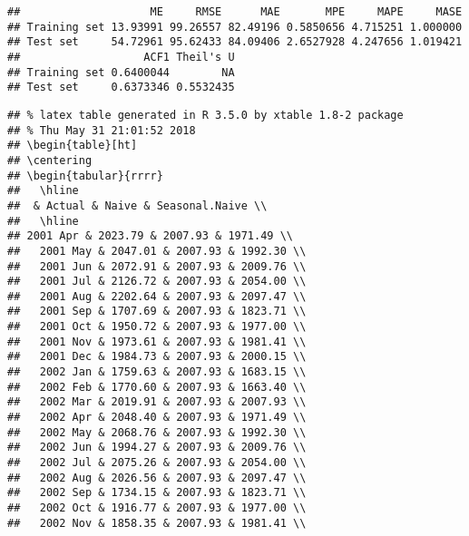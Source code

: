 \documentclass[]{article}
\begin{document}
\begin{verbatim}
##                    ME     RMSE      MAE       MPE     MAPE     MASE
## Training set 13.93991 99.26557 82.49196 0.5850656 4.715251 1.000000
## Test set     54.72961 95.62433 84.09406 2.6527928 4.247656 1.019421
##                   ACF1 Theil's U
## Training set 0.6400044        NA
## Test set     0.6373346 0.5532435
\end{verbatim}

\begin{verbatim}
## % latex table generated in R 3.5.0 by xtable 1.8-2 package
## % Thu May 31 21:01:52 2018
## \begin{table}[ht]
## \centering
## \begin{tabular}{rrrr}
##   \hline
##  & Actual & Naive & Seasonal.Naive \\ 
##   \hline
## 2001 Apr & 2023.79 & 2007.93 & 1971.49 \\ 
##   2001 May & 2047.01 & 2007.93 & 1992.30 \\ 
##   2001 Jun & 2072.91 & 2007.93 & 2009.76 \\ 
##   2001 Jul & 2126.72 & 2007.93 & 2054.00 \\ 
##   2001 Aug & 2202.64 & 2007.93 & 2097.47 \\ 
##   2001 Sep & 1707.69 & 2007.93 & 1823.71 \\ 
##   2001 Oct & 1950.72 & 2007.93 & 1977.00 \\ 
##   2001 Nov & 1973.61 & 2007.93 & 1981.41 \\ 
##   2001 Dec & 1984.73 & 2007.93 & 2000.15 \\ 
##   2002 Jan & 1759.63 & 2007.93 & 1683.15 \\ 
##   2002 Feb & 1770.60 & 2007.93 & 1663.40 \\ 
##   2002 Mar & 2019.91 & 2007.93 & 2007.93 \\ 
##   2002 Apr & 2048.40 & 2007.93 & 1971.49 \\ 
##   2002 May & 2068.76 & 2007.93 & 1992.30 \\ 
##   2002 Jun & 1994.27 & 2007.93 & 2009.76 \\ 
##   2002 Jul & 2075.26 & 2007.93 & 2054.00 \\ 
##   2002 Aug & 2026.56 & 2007.93 & 2097.47 \\ 
##   2002 Sep & 1734.15 & 2007.93 & 1823.71 \\ 
##   2002 Oct & 1916.77 & 2007.93 & 1977.00 \\ 
##   2002 Nov & 1858.35 & 2007.93 & 1981.41 \\ 

\end{verbatim}
\end{document}
